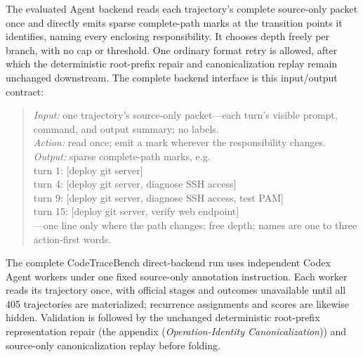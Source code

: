 \documentclass[letterpaper]{article}
\begin{document}
The evaluated Agent backend reads each trajectory's complete source-only packet
once and directly emits sparse complete-path marks at the transition points it
identifies, naming every enclosing responsibility. It chooses depth freely per
branch, with no cap or threshold. One ordinary format retry is allowed, after
which the deterministic root-prefix repair and canonicalization replay remain
unchanged downstream.
The complete backend interface is this input/output contract:
\begin{quote}\small
\emph{Input:} one trajectory's source-only packet---each turn's visible
prompt, command, and output summary; no labels.\\
\emph{Action:} read once; emit a mark wherever the responsibility changes.\\
\emph{Output:} sparse complete-path marks, e.g.\\
{\ttfamily turn 1: [deploy git server]\\
turn 4: [deploy git server, diagnose SSH access]\\
turn 9: [deploy git server, diagnose SSH access, test PAM]\\
turn 15: [deploy git server, verify web endpoint]}\\
---one line only where the path changes; free depth; names are one to
three action-first words.
\end{quote}

The complete CodeTraceBench direct-backend run uses independent Codex Agent
workers under one fixed source-only annotation instruction. Each worker reads
its trajectory once, with official stages and outcomes unavailable until all
405 trajectories are materialized; recurrence assignments and scores are
likewise hidden. Validation is followed by the unchanged deterministic
root-prefix representation repair (the appendix (\emph{Operation-Identity Canonicalization})) and
source-only canonicalization replay before folding.
\end{document}
